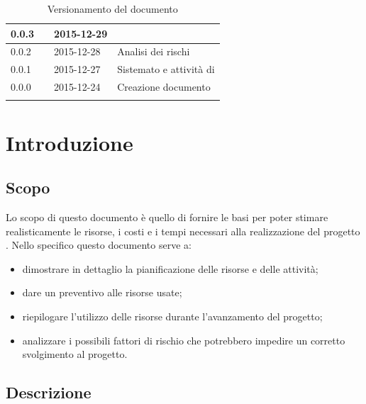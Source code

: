 \documentclass[12pt,a4paper]{article}
\begin{document}
\begin{center}
\begin{longtable}[H]{p{} p{} p{} p{}}
		\midrule
		0.0.3 & \TP{} & 2015-12-29 &  \FPA{} \\*
		\midrule
		0.0.2 & \NDC{} & 2015-12-28 &  Analisi dei rischi \\*
		\midrule
		0.0.1 & \NDC{} & 2015-12-27 &  Sistemato \mgls{template} e attività di \FA{} \\*
		\midrule
		0.0.0 & \NDC{} & 2015-12-24 &  Creazione documento \\*
		\bottomrule
		\caption{Versionamento del documento}
		\label{tabVers1}
	\end{longtable}
\end{center}

\newpage
\tableofcontents
\newpage
\listoftables
\newpage
\listoffigures
\newpage

\section{Introduzione} 

\subsection{Scopo}
Lo scopo di questo documento è quello di fornire le basi per poter stimare realisticamente le risorse, i costi e i tempi necessari alla realizzazione del progetto \textit{\prjL{}}. Nello specifico questo documento serve a:
\begin{itemize}
	\item dimostrare in dettaglio la pianificazione delle risorse e delle attività;
	\item dare un preventivo alle risorse usate;
	\item riepilogare l'utilizzo delle risorse durante l'avanzamento del progetto;
	\item analizzare i possibili fattori di rischio che potrebbero impedire un corretto svolgimento al progetto.
\end{itemize}

\subsection{Descrizione}
\end{document}
